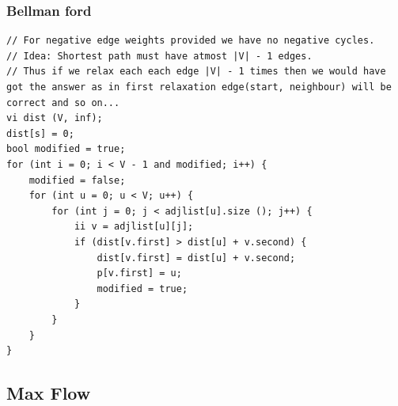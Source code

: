 \documentclass[8pt, a4paper, oneside, twocolumn]{extarticle}
\begin{document}
\subsubsection{Bellman ford}
\begin{verbatim} 
// For negative edge weights provided we have no negative cycles.
// Idea: Shortest path must have atmost |V| - 1 edges.
// Thus if we relax each each edge |V| - 1 times then we would have got the answer as in first relaxation edge(start, neighbour) will be correct and so on...
vi dist (V, inf);
dist[s] = 0;
bool modified = true;
for (int i = 0; i < V - 1 and modified; i++) {
    modified = false;
    for (int u = 0; u < V; u++) {
        for (int j = 0; j < adjlist[u].size (); j++) {
            ii v = adjlist[u][j];
            if (dist[v.first] > dist[u] + v.second) {
                dist[v.first] = dist[u] + v.second;
                p[v.first] = u;
                modified = true;
            }
        }
    }
}
\end{verbatim}
\subsection{Max Flow}
\end{document}
